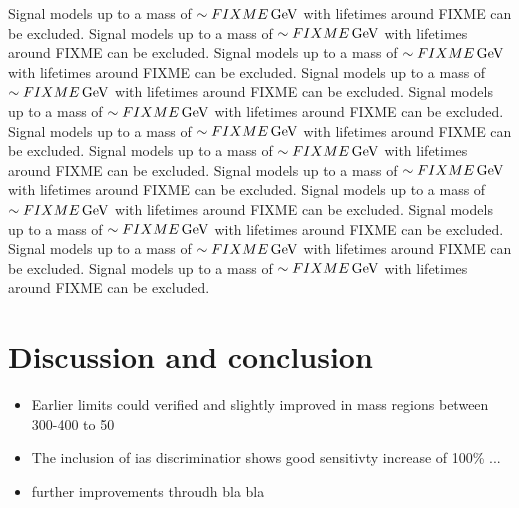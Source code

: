 Signal models up to a mass of $\sim FIXME \,\text{Ge}\kern-0.06667em\text{V}$ with lifetimes around FIXME can be excluded.
Signal models up to a mass of $\sim FIXME \,\text{Ge}\kern-0.06667em\text{V}$ with lifetimes around FIXME can be excluded.
Signal models up to a mass of $\sim FIXME \,\text{Ge}\kern-0.06667em\text{V}$ with lifetimes around FIXME can be excluded.
Signal models up to a mass of $\sim FIXME \,\text{Ge}\kern-0.06667em\text{V}$ with lifetimes around FIXME can be excluded.
Signal models up to a mass of $\sim FIXME \,\text{Ge}\kern-0.06667em\text{V}$ with lifetimes around FIXME can be excluded.
Signal models up to a mass of $\sim FIXME \,\text{Ge}\kern-0.06667em\text{V}$ with lifetimes around FIXME can be excluded.
Signal models up to a mass of $\sim FIXME \,\text{Ge}\kern-0.06667em\text{V}$ with lifetimes around FIXME can be excluded.
Signal models up to a mass of $\sim FIXME \,\text{Ge}\kern-0.06667em\text{V}$ with lifetimes around FIXME can be excluded.
Signal models up to a mass of $\sim FIXME \,\text{Ge}\kern-0.06667em\text{V}$ with lifetimes around FIXME can be excluded.
Signal models up to a mass of $\sim FIXME \,\text{Ge}\kern-0.06667em\text{V}$ with lifetimes around FIXME can be excluded.
Signal models up to a mass of $\sim FIXME \,\text{Ge}\kern-0.06667em\text{V}$ with lifetimes around FIXME can be excluded.
Signal models up to a mass of $\sim FIXME \,\text{Ge}\kern-0.06667em\text{V}$ with lifetimes around FIXME can be excluded.


\chapter{Discussion and conclusion}
\label{sec:Discussion}

\begin{itemize}
\item Earlier limits could verified and slightly improved in mass regions between 300-400 to 50\gev
\item The inclusion of ias discriminatior shows good sensitivty increase of 100\% ...
\item further improvements throudh bla bla
\end{itemize}
